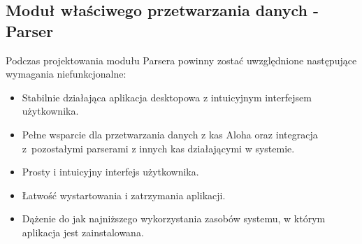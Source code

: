 \documentclass[a4paper]{book}
\begin{document}
\subsection{Moduł właściwego przetwarzania danych - Parser} 
Podczas projektowania modułu Parsera powinny zostać uwzględnione następujące wymagania niefunkcjonalne:
 \begin{itemize}
 	\item Stabilnie działająca aplikacja desktopowa z intuicyjnym interfejsem użytkownika.
 	\item Pełne wsparcie dla przetwarzania danych z kas Aloha oraz integracja z~pozostałymi parserami z innych kas działającymi w systemie.
 	\item Prosty i intuicyjny interfejs użytkownika.
 	\item Łatwość wystartowania i zatrzymania aplikacji.
 	\item Dążenie do jak najniższego wykorzystania zasobów systemu, w którym aplikacja jest zainstalowana.
 \end{itemize}
\end{document}
